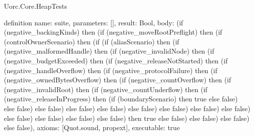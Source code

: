 \begin{lexlean}{Uorc.Core.HeapTests}
\begin{semanticmodule}
definition{
  name: suite,
  parameters: [],
  result: Bool,
  body: (if (negative_backingKinds) then (if (negative_moveRootPreflight) then (if (controlOwnerScenario) then (if (if (aliasScenario) then (if (negative_malformedHandle) then (if (negative_invalidNode) then (if (negative_budgetExceeded) then (if (negative_releaseNotStarted) then (if (negative_handleOverflow) then (if (negative_protocolFailure) then (if (negative_ownedBytesOverflow) then (if (negative_countOverflow) then (if (negative_invalidRoot) then (if (negative_countUnderflow) then (if (negative_releaseInProgress) then (if (boundaryScenario) then true else false) else false) else false) else false) else false) else false) else false) else false) else false) else false) else false) else false) else false) then true else false) else false) else false) else false),
  axioms: [Quot.sound, propext],
  executable: true
}
\end{semanticmodule}
\end{lexlean}
